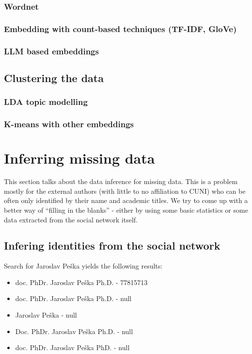 \subsubsection{Wordnet}

\subsubsection{Embedding with count-based techniques (TF-IDF, GloVe)}

\subsubsection{LLM based embeddings}

\subsection{Clustering the data}

\subsubsection{LDA topic modelling}

\subsubsection{K-means with other embeddings}

\section{Inferring missing data}

This section talks about the data inference for missing data. This is a problem mostly for the external authors (with little to no affiliation to CUNI) who can be often only identified by their name and academic titles. We try to come up with a better way of ``filling in the blanks'' - either by using some basic statistics or some data extracted from the social network itself.

\subsection{Infering identities from the social network}

Search for Jaroslav Peška yields the following results:
\begin{itemize}
    \item doc. PhDr. Jaroslav Peška Ph.D. - 77815713
    \item doc. PhDr. Jaroslav Peška Ph.D. - null
    \item Jaroslav Peška - null
    \item Doc. PhDr. Jaroslav Peška Ph.D. - null
    \item doc. PhDr. Jaroslav Peška PhD. - null
\end{itemize}

